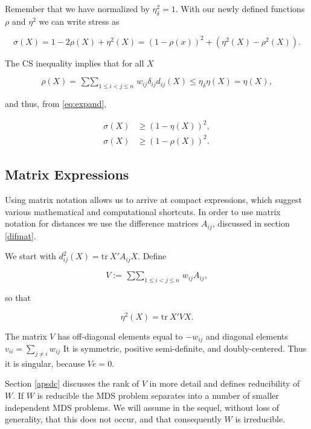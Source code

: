\documentclass[
  12pt,
]{book}
\theoremstyle{definition}
\theoremstyle{definition}
\theoremstyle{definition}
\theoremstyle{definition}
\theoremstyle{remark}
\begin{document}
Remember that we have normalized by \(\eta_\delta^2=1\). With our newly defined functions \(\rho\) and \(\eta^2\) we can write stress as

\begin{equation}
\sigma(X)=1-2\rho(X)+\eta^2(X)=(1-\rho(x))^2+(\eta^2(X)-\rho^2(X)).
\label{eq:expand}
\end{equation}

The CS inequality implies that for all \(X\)

\begin{equation}
\rho(X)=\mathop{\sum\sum}_{1\leq i<j\leq n}w_{ij}\delta_{ij}d_{ij}(X)\leq\eta_\delta\eta(X)=\eta(X),
\label{eq:propcsrhoeta}
\end{equation}

and thus, from \eqref{eq:expand},

\begin{align}
\sigma(X)&\geq(1-\eta(X))^2,\label{eq:propcssigeta1}\\
\sigma(X)&\geq(1-\rho(X))^2.\label{eq:propcssigeta2}
\end{align}

\hypertarget{propmatrix}{%
\subsection{Matrix Expressions}\label{propmatrix}}

Using matrix notation allows us to arrive at compact expressions, which suggest various mathematical and computational shortcuts. In order to use matrix notation for distances we use the difference matrices \(A_{ij}\), discussed in section \ref{difmat}.

We start with \(d_{ij}^2(X)=\text{tr}\ X'A_{ij}X\). Define

\begin{equation}
V:=\mathop{\sum\sum}_{1\leq i<j\leq n}w_{ij}A_{ij},
\label{eq:vdef}
\end{equation}

so that

\begin{equation}
\eta^2(X)=\text{tr}\ X'VX.
\label{eq:etav}
\end{equation}

The matrix \(V\) has off-diagonal elements equal to \(-w_{ij}\) and diagonal elements \(v_{ii}=\sum_{j\not= i} w_{ij}\) It is symmetric, positive semi-definite, and doubly-centered. Thus it is singular, because \(Ve=0\).

Section \ref{apsdc} discusses the rank of \(V\) in more detail and defines reducibility of \(W\). If \(W\) is reducible the MDS problem separates into a number of smaller independent MDS problems. We will assume in the sequel, without loss of generality, that this does not occur, and that consequently \(W\) is irreducible.
\end{document}
